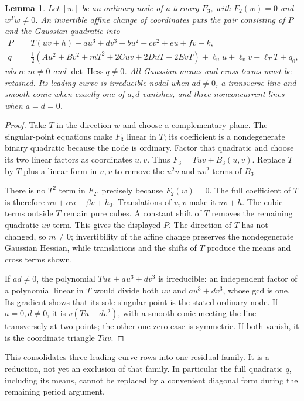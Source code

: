 \documentclass[11pt]{article}
\newtheorem{lemma}[theorem]{Lemma}
\theoremstyle{definition}\newtheorem{definition}[theorem]{Definition}
\theoremstyle{remark}\newtheorem{remark}[theorem]{Remark}
\begin{document}
\begin{lemma}\label{lem:ordinarynormal}
Let $[w]$ be an ordinary node of a ternary $F_3$, with $F_2(w)=0$
and $w^Tw\ne0$. An invertible affine change of coordinates puts
the pair consisting of $P$ and the Gaussian quadratic into
\begin{align*}
 P={}&T(uv+h)+a u^3+d v^3+b u^2+c v^2+e u+f v+k,\\
 q={}&\tfrac12(Au^2+Bv^2+mT^2+2Cuv+2DuT+2EvT)
                  +\ell_u u+\ell_v v+\ell_T T+q_0,
\end{align*}
where $m\ne0$ and $\det\operatorname{Hess}q\ne0$.
All Gaussian means and cross terms must be retained. Its leading
curve is irreducible nodal when $ad\ne0$, a transverse line and
smooth conic when exactly one of $a,d$ vanishes, and three
nonconcurrent lines when $a=d=0$.
\end{lemma}
\begin{proof}
Take $T$ in the direction $w$ and choose a complementary plane.
The singular-point equations make $F_3$ linear in $T$; its
coefficient is a nondegenerate binary quadratic because the node
is ordinary. Factor that quadratic and choose its two linear
factors as coordinates $u,v$. Thus $F_3=Tuv+B_3(u,v)$.
Replace $T$ by $T$ plus a linear form in $u,v$ to remove the
$u^2v$ and $uv^2$ terms of $B_3$.

There is no $T^2$ term in $F_2$, precisely because $F_2(w)=0$.
The full coefficient of $T$ is therefore
$uv+\alpha u+\beta v+h_0$. Translations of $u,v$ make it $uv+h$.
The cubic terms outside $T$ remain pure cubes. A constant shift
of $T$ removes the remaining quadratic $uv$ term. This gives the
displayed $P$. The direction of $T$ has not changed, so $m\ne0$;
invertibility of the affine change preserves the nondegenerate
Gaussian Hessian, while translations and the shifts of $T$ produce
the means and cross terms shown.

If $ad\ne0$, the polynomial $Tuv+a u^3+d v^3$ is irreducible:
an independent factor of a polynomial linear in $T$ would divide
both $uv$ and $a u^3+d v^3$, whose gcd is one. Its gradient shows
that its sole singular point is the stated ordinary node. If
$a=0,d\ne0$, it is $v(Tu+d v^2)$, with a smooth conic meeting
the line transversely at two points; the other one-zero case is
symmetric. If both vanish, it is the coordinate triangle $Tuv$.
\end{proof}

This consolidates three leading-curve rows into one residual family.
It is a reduction, not yet an exclusion of that family. In particular
the full quadratic $q$, including its means, cannot be replaced by
a convenient diagonal form during the remaining period argument.
\end{document}
